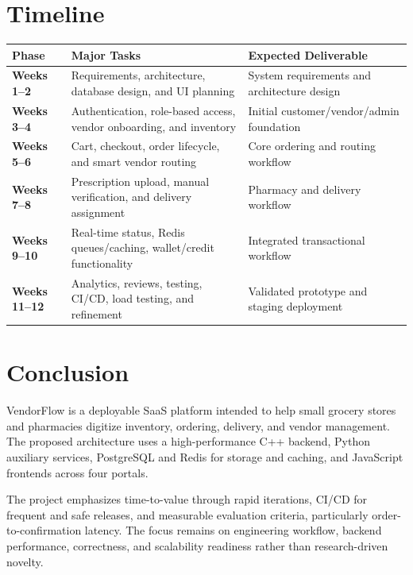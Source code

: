 \documentclass[11pt,a4paper]{article}
\begin{document}
\section{Timeline}

\begin{center}
\renewcommand{\arraystretch}{1.25}
\begin{tabularx}{\textwidth}{>{\bfseries}p{} X X}
\toprule
Phase & Major Tasks & Expected Deliverable \\
\midrule
Weeks 1--2 & Requirements, architecture, database design, and UI planning &
System requirements and architecture design \\
Weeks 3--4 & Authentication, role-based access, vendor onboarding, and inventory &
Initial customer/vendor/admin foundation \\
Weeks 5--6 & Cart, checkout, order lifecycle, and smart vendor routing &
Core ordering and routing workflow \\
Weeks 7--8 & Prescription upload, manual verification, and delivery assignment &
Pharmacy and delivery workflow \\
Weeks 9--10 & Real-time status, Redis queues/caching, wallet/credit functionality &
Integrated transactional workflow \\
Weeks 11--12 & Analytics, reviews, testing, CI/CD, load testing, and refinement &
Validated prototype and staging deployment \\
\bottomrule
\end{tabularx}
\end{center}

\section{Conclusion}

VendorFlow is a deployable SaaS platform intended to help small grocery stores and pharmacies
digitize inventory, ordering, delivery, and vendor management. The proposed architecture uses
a high-performance C++ backend, Python auxiliary services, PostgreSQL and Redis for storage
and caching, and JavaScript frontends across four portals.

The project emphasizes time-to-value through rapid iterations, CI/CD for frequent and safe
releases, and measurable evaluation criteria, particularly order-to-confirmation latency.
The focus remains on engineering workflow, backend performance, correctness, and scalability
readiness rather than research-driven novelty.
\end{document}
